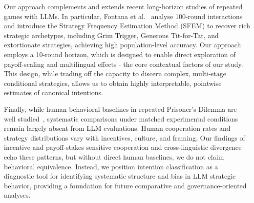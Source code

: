 \documentclass{article}
\begin{document}
Our approach complements and extends recent long-horizon studies of repeated games with LLMs. In particular, Fontana et al.~\cite{fontana2025nicer} analyse 100-round interactions and introduce the Strategy Frequency Estimation Method (SFEM) to recover rich strategic archetypes, including Grim Trigger, Generous Tit-for-Tat, and extortionate strategies, achieving high population-level accuracy. %
Our approach employs a 10-round horizon, which is  designed to enable direct exploration of payoff-scaling and multilingual effects - the core contextual factors of our study. This design, while trading off the capacity to discern complex, multi-stage conditional strategies, allows us to obtain highly interpretable, pointwise estimates of canonical intentions.%

Finally, while human behavioral baselines in repeated Prisoner’s Dilemma are well studied~\cite{inferenceStrategies,akata2025,Axelrod1980Effective,krockow2016cooperation}, systematic comparisons under matched experimental conditions remain largely absent from LLM evaluations. Human cooperation rates and strategy distributions vary with incentives, culture, and framing. Our findings of incentive and payoff-stakes sensitive cooperation and cross-linguistic divergence echo these patterns, but without direct human baselines, we do not claim behavioral equivalence. Instead, we position intention classification as a diagnostic tool for identifying systematic structure and bias in LLM strategic behavior, providing a foundation for future comparative and governance-oriented analyses.



\end{document}
